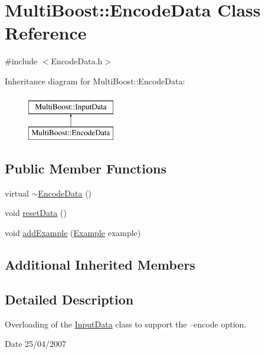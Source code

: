 \hypertarget{classMultiBoost_1_1EncodeData}{\section{Multi\-Boost\-:\-:Encode\-Data Class Reference}
\label{classMultiBoost_1_1EncodeData}
}


{\ttfamily \#include $<$Encode\-Data.\-h$>$}

Inheritance diagram for Multi\-Boost\-:\-:Encode\-Data\-:\begin{figure}[H]
\begin{center}
\leavevmode
\includegraphics[height=2.000000cm]{classMultiBoost_1_1EncodeData}
\end{center}
\end{figure}
\subsection*{Public Member Functions}
\begin{DoxyCompactItemize}
\item 
virtual \hyperlink{classMultiBoost_1_1EncodeData_a2af186d199e6d905f5c6b9ac9056c0eb}{$\sim$\-Encode\-Data} ()
\item 
void \hyperlink{classMultiBoost_1_1EncodeData_a07495437c7c1d6aab0489b313dbfa0d1}{reset\-Data} ()
\item 
void \hyperlink{classMultiBoost_1_1EncodeData_a3d06728fa8285ad4d62700a50bcba901}{add\-Example} (\hyperlink{classMultiBoost_1_1Example}{Example} example)
\end{DoxyCompactItemize}
\subsection*{Additional Inherited Members}


\subsection{Detailed Description}
Overloading of the \hyperlink{classMultiBoost_1_1InputData}{Input\-Data} class to support the --encode option. \begin{DoxyDate}{Date}
25/04/2007 
\end{DoxyDate}


